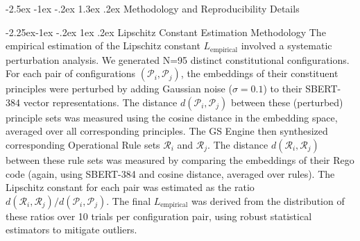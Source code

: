 \documentclass[manuscript,screen,review,anonymous,9pt]{acmart}
\makeatletter
\renewcommand\section{\@startsection{section}{1}{\z@}%
  {-2.5ex \@plus -1ex \@minus -.2ex}%
  {1.3ex \@plus.2ex}%
  {\normalfont\Large\bfseries}}
\renewcommand\subsection{\@startsection{subsection}{2}{\z@}%
  {-2.25ex\@plus -1ex \@minus -.2ex}%
  {1ex \@plus .2ex}%
  {\normalfont\large\bfseries}}
\makeatother
\begin{document}
\section{Methodology and Reproducibility Details}
\label{app:methodology}

\subsection{Lipschitz Constant Estimation Methodology}
\label{app:lipschitz_estimation}
The empirical estimation of the Lipschitz constant $L_{\text{empirical}}$ involved a systematic perturbation analysis. We generated N=95 distinct constitutional configurations. For each pair of configurations $(\mathcal{P}_i, \mathcal{P}_j)$, the embeddings of their constituent principles were perturbed by adding Gaussian noise ($\sigma=0.1$) to their SBERT-384 vector representations. The distance $d(\mathcal{P}_i, \mathcal{P}_j)$ between these (perturbed) principle sets was measured using the cosine distance in the embedding space, averaged over all corresponding principles. The GS Engine then synthesized corresponding Operational Rule sets $\mathcal{R}_i$ and $\mathcal{R}_j$. The distance $d(\mathcal{R}_i, \mathcal{R}_j)$ between these rule sets was measured by comparing the embeddings of their Rego code (again, using SBERT-384 and cosine distance, averaged over rules). The Lipschitz constant for each pair was estimated as the ratio $d(\mathcal{R}_i, \mathcal{R}_j) / d(\mathcal{P}_i, \mathcal{P}_j)$. The final $L_{\text{empirical}}$ was derived from the distribution of these ratios over 10 trials per configuration pair, using robust statistical estimators to mitigate outliers.
\end{document}
